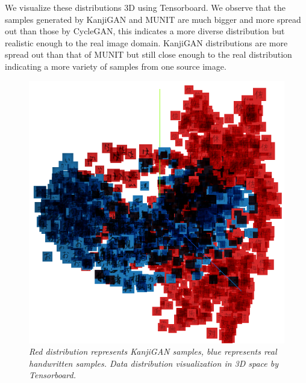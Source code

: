 \documentclass[12pt]{report}
\begin{document}
We visualize these distributions 3D using Tensorboard. We observe that the samples generated by KanjiGAN and MUNIT are much bigger and more spread out than those by CycleGAN, this indicates a more diverse distribution but realistic enough to the real image domain. KanjiGAN distributions are more spread out than that of MUNIT but still close enough to the real distribution indicating a more variety of samples from one source image.

\begin{figure}[H]
	\centering
	\includegraphics[scale=1]{real-kanjigan}
	\caption{\textit{Red distribution represents KanjiGAN samples, blue represents real handwritten samples. Data distribution visualization in 3D space by Tensorboard. }}
	\label{fig:data-distribution-2}
\end{figure}
\end{document}
